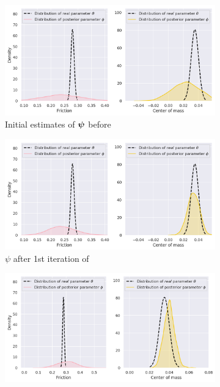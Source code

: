 \begin{figure}
\centering
{}
\captionsetup{size=footnotesize}
\begin{subfigure}{0.45\textwidth}
  \includegraphics[width=\textwidth]{img/yumi/latent-representation/yumi_latent_encoding_0_iter}%
  \caption{Initial estimates of $\boldsymbol{\psi}$ before \dettostoc{}}
\end{subfigure}
\begin{subfigure}{0.45\textwidth}
  \centering
  \includegraphics[width=\linewidth]{img/yumi/latent-representation/yumi_latent_encoding_1_iter}
  \caption{$\psi$ after 1st iteration of \dettostoc{}}
\end{subfigure}
\begin{subfigure}{0.45\textwidth}
  \centering
  \includegraphics[width=\linewidth]{img/yumi/latent-representation/yumi_latent_encoding_2_iter}

\end{subfigure}
\end{figure}
